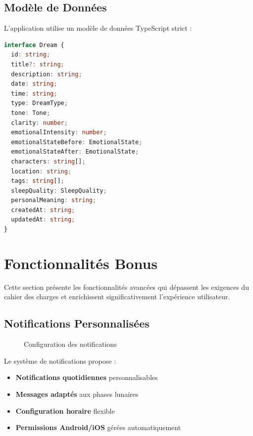 \documentclass[12pt,a4paper]{article}
\begin{document}
\subsection{Modèle de Données}

L'application utilise un modèle de données TypeScript strict :

\begin{lstlisting}[language=typescript, caption=Interface Dream]
interface Dream {
  id: string;
  title?: string;
  description: string;
  date: string;
  time: string;
  type: DreamType;
  tone: Tone;
  clarity: number;
  emotionalIntensity: number;
  emotionalStateBefore: EmotionalState;
  emotionalStateAfter: EmotionalState;
  characters: string[];
  location: string;
  tags: string[];
  sleepQuality: SleepQuality;
  personalMeaning: string;
  createdAt: string;
  updatedAt: string;
}
\end{lstlisting}

\section{Fonctionnalités Bonus}

Cette section présente les fonctionnalités avancées qui dépassent les exigences du cahier des charges et enrichissent significativement l'expérience utilisateur.

\subsection{Notifications Personnalisées}

\begin{figure}[H]
    \centering
    \caption{Configuration des notifications}
\end{figure}

Le système de notifications propose :

\begin{itemize}
    \item \textbf{Notifications quotidiennes} personnalisables
    \item \textbf{Messages adaptés} aux phases lunaires
    \item \textbf{Configuration horaire} flexible
    \item \textbf{Permissions Android/iOS} gérées automatiquement
\end{itemize}
\end{document}
